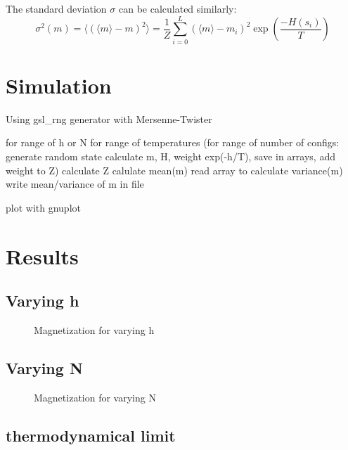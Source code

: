 \documentclass{scrartcl}
\begin{document}
The standard deviation $\sigma$ can be calculated similarly:
\[\sigma^2(m)=\langle(\langle m\rangle-m)^2\rangle=\frac{1}{Z}\sum_{i=0}^{L}(\langle m\rangle-m_i)^2\exp\left( \frac{-H(s_i)}{T}\right) \]



\section{Simulation}
Using gsl\_rng generator with Mersenne-Twister\cite{gsldoc}

for range of h or N
for range of temperatures
(for range of number of configs:
generate random state
calculate m, H, weight exp(-h/T), save in arrays, add weight to Z)
calculate Z
calulate mean(m)
read array to calculate variance(m)
write mean/variance of m in file

plot with gnuplot

\section{Results}
\label{sec:results}
\subsection{Varying h}

	\begin{figure}[htbp]
		
		\caption{Magnetization for varying h}
		\label{fig:magvarh}
	\end{figure}
	
\subsection{Varying N}

	\begin{figure}[htbp]
		
		\caption{Magnetization for varying N}
		\label{fig:magvarN}
	\end{figure}
	
\subsection{thermodynamical limit}

	
%	
	
\newpage	
\listoffigures
\printbibliography
\end{document}
